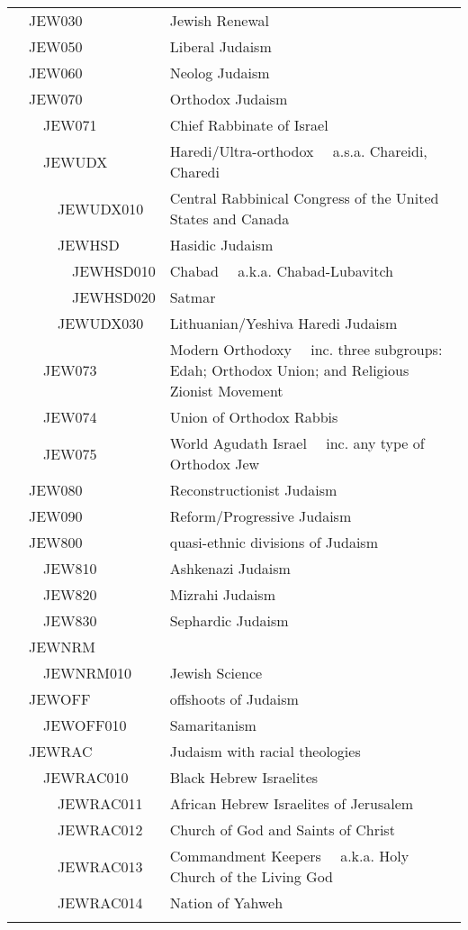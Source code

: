 \documentclass[12pt]{article}
\begin{document}
\begin{tiny}
\begin{center}
\begin{longtable}{|l|l|}
~~JEW030 & Jewish Renewal \\
~~JEW050 & Liberal Judaism \\
~~JEW060 & Neolog Judaism \\
~~JEW070 & Orthodox Judaism \\
~~~~JEW071 & Chief Rabbinate of Israel \\
~~~~JEWUDX & Haredi/Ultra-orthodox	~~a.s.a. Chareidi, Charedi \\
~~~~~~JEWUDX010 & Central Rabbinical Congress of the United States and Canada \\
~~~~~~JEWHSD & Hasidic Judaism \\
~~~~~~~~JEWHSD010 & Chabad	~~a.k.a. Chabad-Lubavitch \\
~~~~~~~~JEWHSD020 & Satmar \\
~~~~~~JEWUDX030 & Lithuanian/Yeshiva Haredi Judaism \\
~~~~JEW073 & Modern Orthodoxy	~~inc. three subgroups: Edah; Orthodox Union; and Religious Zionist Movement \\
~~~~JEW074 & Union of Orthodox Rabbis \\
~~~~JEW075 & World Agudath Israel	~~inc. any type of Orthodox Jew \\
~~JEW080 & Reconstructionist Judaism \\
~~JEW090 & Reform/Progressive Judaism \\
~~JEW800 & quasi-ethnic divisions of Judaism \\
~~~~JEW810 & Ashkenazi Judaism \\
~~~~JEW820 & Mizrahi Judaism \\
~~~~JEW830 & Sephardic Judaism \\
~~JEWNRM \\
~~~~JEWNRM010 & Jewish Science \\
~~JEWOFF & offshoots of Judaism \\
~~~~JEWOFF010 & Samaritanism \\
~~JEWRAC & Judaism with racial theologies \\
~~~~JEWRAC010 & Black Hebrew Israelites \\
~~~~~~JEWRAC011 & African Hebrew Israelites of Jerusalem \\
~~~~~~JEWRAC012 & Church of God and Saints of Christ \\
~~~~~~JEWRAC013 & Commandment Keepers	~~a.k.a. Holy Church of the Living God \\
~~~~~~JEWRAC014 & Nation of Yahweh \\
 \\

\end{longtable}
\end{center}
\end{tiny}
\end{document}
